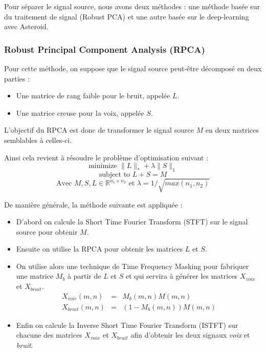 \documentclass{article}
\begin{document}
Pour séparer le signal source, nous avons deux méthodes : une méthode basée sur du traitement de signal (Robust PCA) et une autre basée sur le deep-learning avec Asteroid.

\subsubsection{Robust Principal Component Analysis (RPCA)}

Pour cette méthode, on suppose que le signal source peut-être décomposé en deux parties :
\begin{itemize}
    \item Une matrice de rang faible pour le bruit, appelée $L$.
    \item Une matrice creuse pour la voix, appelée $S$.
\end{itemize}
L'objectif du RPCA est donc de transformer le signal source $M$ en deux matrices semblables à celles-ci. 

Ainsi cela revient à résoudre le problème d'optimisation suivant :
\[ \mbox{minimize } \|L\|_* + \lambda \|S\|_1 \]
\[ \mbox{subject to } L + S = M \]
\[
    \mbox{Avec } M, S, L \in \mathbb{R}^{n_1 \times n_2} \mbox{ et } \lambda = 1 / \sqrt{max(n_1,n_2)}
\]

De manière générale, la méthode suivante est appliquée :
\begin{itemize}
    \item D'abord on calcule la Short Time Fourier Transform (STFT) sur le signal source pour obtenir $M$.
    
    \item Ensuite on utilise la RPCA pour obtenir les matrices $L$ et $S$.
    
    \item On utilise alors une technique de Time Frequency Masking pour fabriquer une matrice $M_b$ à partir de $L$ et $S$ et qui servira à générer les matrices $X_{voix}$ et $X_{bruit}$.
    \begin{eqnarray*}
        X_{voie}(m,n) & = & M_b(m,n)M(m,n) \\
        X_{bruit}(m,n) & = & (1-M_b(m,n))M(m,n)
    \end{eqnarray*}

    \item Enfin on calcule la Inverse Short Time Fourier Transform (ISTFT) sur chacune des matrices $X_{voix}$ et $X_{bruit}$ afin d'obtenir les deux signaux \emph{voix} et \emph{bruit}.
\end{itemize}
\end{document}
